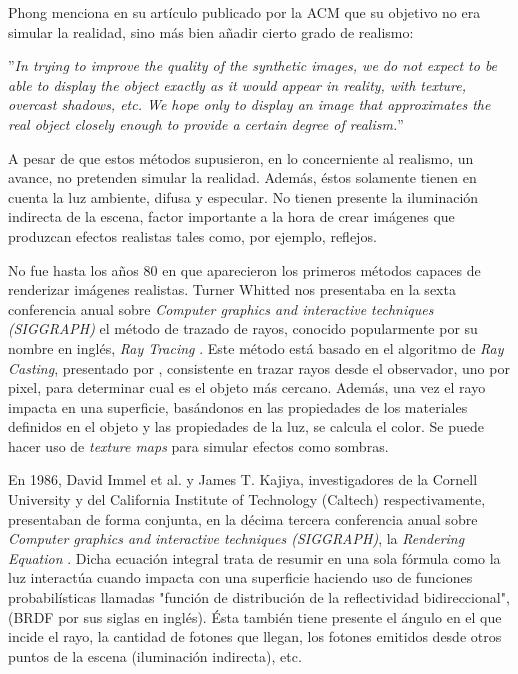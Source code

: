 \documentclass[titlepage,12pt]{article}
\begin{document}
Phong menciona en su artículo publicado por la ACM \citep[p.~311]{Phong1975} que su objetivo no era simular la realidad, sino más bien añadir cierto grado de realismo:
\vspace{5mm}

\begin{mdframed}[hidealllines=true,backgroundcolor=gray!20] ''\textit{In trying to improve the quality of the synthetic images, we do not expect to be able to display the object exactly as it would appear in reality, with texture, overcast shadows, etc. We hope only to display an image that approximates the real object closely enough to provide a certain degree of realism.}'' 
\end{mdframed}

A pesar de que estos métodos supusieron, en lo concerniente al realismo, un avance, no pretenden simular la realidad. Además, éstos solamente tienen en cuenta la luz ambiente, difusa y especular. No tienen presente la iluminación indirecta de la escena, factor importante a la hora de crear imágenes que produzcan efectos realistas tales como, por ejemplo, reflejos.

No fue hasta los años 80 en que aparecieron los primeros métodos capaces de renderizar imágenes realistas. Turner Whitted nos presentaba en la sexta conferencia anual sobre \textit{Computer graphics and interactive techniques (SIGGRAPH)} el método de trazado de rayos, conocido popularmente por su nombre en inglés, \textit{Ray Tracing} \citep{Whitted1980}. Este método está basado en el algoritmo de \textit{Ray Casting}, presentado por \citep{Appel1968}, consistente en trazar rayos desde el observador, uno por pixel, para determinar cual es el objeto más cercano. Además, una vez el rayo impacta en una superficie, basándonos en las propiedades de los materiales definidos en el objeto y las propiedades de la luz, se calcula el color. Se puede hacer uso de \textit{texture maps} para simular efectos como sombras. 

En 1986, David Immel et al. y James T. Kajiya, investigadores de la Cornell University y del California Institute of Technology (Caltech) respectivamente, presentaban de forma conjunta, en la décima tercera conferencia anual sobre \textit{Computer graphics and interactive techniques (SIGGRAPH)}, la \textit{Rendering Equation} \citep{Kajiya1986, Immel1986}. Dicha ecuación integral trata de resumir en una sola fórmula como la luz interactúa cuando impacta con una superficie haciendo uso de funciones probabilísticas llamadas "función de distribución de la reflectividad bidireccional", (BRDF por sus siglas en inglés). Ésta también tiene presente el ángulo en el que incide el rayo, la cantidad de fotones que llegan, los fotones emitidos desde otros puntos de la escena (iluminación indirecta), etc.
\end{document}
